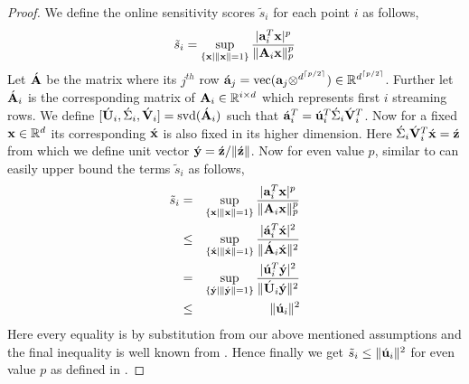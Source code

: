 \begin{proof}{\label{proof:slowOnlineSensitivityBound}}
 We define the online sensitivity scores $\tilde{s}_{i}$ for each point $i$ as follows,
  \begin{equation*}
    \tilde{s}_{i} = \sup_{\{\mathbf{x}\mid\|\mathbf{x}\|=1\}}\frac{|\mathbf{a}_{i}^{T}\mathbf{x}|^{p}}{\|\mathbf{A}_{i}\mathbf{x}\|_{p}^{p}}
  \end{equation*}
  Let $\acute{\mathbf{A}}$ be the matrix where its $j^{th}$ row $\acute{\mathbf{a}}_{j} = \mbox{vec}(\mathbf{a}_{j} \otimes^{d^{\lceil p/2 \rceil}}) \in \mathbb{R}^{d^{\lceil p/2 \rceil}}$. Further let $\acute{\mathbf{A}}_{i}$ is the corresponding matrix of $\mathbf{A}_{i} \in \mathbb{R}^{i \times d}$ which represents first $i$ streaming rows. We define $[\acute{\mathbf{U}}_{i},\acute{\Sigma}_{i},\acute{\mathbf{V}}_{i}] = \mbox{svd}(\acute{\mathbf{A}}_{i})$ such that $\acute{\mathbf{a}}_{i}^{T} = \acute{\mathbf{u}}_{i}^{T}\acute{\Sigma}_{i}\acute{\mathbf{V}}_{i}^{T}$. Now for a fixed $\mathbf{x} \in \mathbb{R}^{d}$ its corresponding $\acute{\mathbf{x}}$ is also fixed in its higher dimension. Here $\acute{\Sigma}_{i}\acute{\mathbf{V}}_{i}^{T}\acute{\mathbf{x}}=\acute{\mathbf{z}}$ from which we define unit vector $\acute{\mathbf{y}} = \acute{\mathbf{z}}/\|\acute{\mathbf{z}}\|$.
  Now for even value $p$, similar to \cite{schechtman2011tight} can easily upper bound the terms $\tilde{s}_{i}$ as follows,
%   
  \begin{eqnarray*}
   \tilde{s}_{i} &=& \sup_{\{\mathbf{x}\mid\|\mathbf{x}\|=1\}}\frac{|\mathbf{a}_{i}^{T}\mathbf{x}|^{p}}{\|\mathbf{A}_{i}\mathbf{x}\|_{p}^{p}} \\
   &\leq& \sup_{\{\acute{\mathbf{x}}\mid\|\acute{\mathbf{x}}\|=1\}}\frac{|\acute{\mathbf{a}}_{i}^{T}\acute{\mathbf{x}}|^{2}}{\|\acute{\mathbf{A}}_{i}\acute{\mathbf{x}}\|^{2}} \\
   &=& \sup_{\{\acute{\mathbf{y}}\mid\|\acute{\mathbf{y}}\|=1\}}\frac{|\acute{\mathbf{u}}_{i}^{T}\acute{\mathbf{y}}|^{2}}{\|\acute{\mathbf{U}}_{i}\acute{\mathbf{y}}\|^{2}} \\
   &\leq& \|\acute{\mathbf{u}}_{i}\|^{2}
  \end{eqnarray*}
  Here every equality is by substitution from our above mentioned assumptions and the final inequality is well known from \cite{woodruff2014sketching, cohen2015uniform}. Hence finally we get $\tilde{s}_{i} \leq \|\acute{\mathbf{u}}_{i}\|^{2}$ for even value $p$ as defined in .
  

\end{proof}
